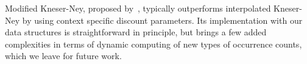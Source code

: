 Modified Kneser-Ney, proposed by~, typically outperforms interpolated Kneser-Ney by using context specific discount parameters.
%
Its implementation with our data structures is straightforward in principle, 
but brings a few added complexities in terms of dynamic computing of 
new types of occurrence counts, which we leave for future work.


